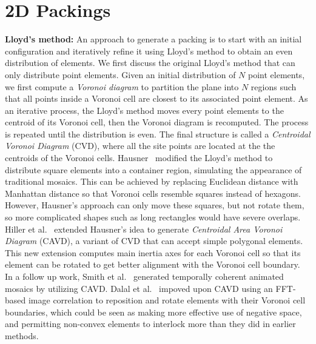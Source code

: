 \section{2D Packings}


\textbf{Lloyd's method:}
An approach to generate a packing is to start with an initial configuration and iteratively refine it using Lloyd's method
to obtain an even distribution of elements. 
We first discuss the original Lloyd's method that can only distribute point elements.
Given an initial distribution of $N$ point elements, 
we first compute a \textit{Voronoi diagram} to partition the plane into $N$ regions such that
all points inside a Voronoi cell are closest to its associated point element.
As an iterative process, 
the Lloyd's method moves every point elements to the centroid of its Voronoi cell, 
then the Voronoi diagram is recomputed.
The process is repeated until the distribution is even.
The final structure is called a \textit{Centroidal Voronoi Diagram} (CVD), 
where all the site points are located at the the centroids of the Voronoi cells. 
Hausner~\cite{Hausner2001} modified the Lloyd's method to distribute square elements into a container 
region, simulating the appearance of traditional mosaics. 
This can be achieved by replacing Euclidean distance with Manhattan distance so that Voronoi cells resemble squares instead of hexagons.
However, Hausner's approach can only move these squares, but not rotate them,
so more complicated shapes such as long rectangles would have severe overlaps.
Hiller et al.~\cite{Hiller2003} extended Hausner's idea to generate \textit{Centroidal Area Voronoi Diagram} (CAVD),
a variant of CVD that can accept simple polygonal elements.
This new extension computes main inertia axes for each Voronoi cell so that 
its element can be rotated to get better alignment
with the Voronoi cell boundary.
In a follow up work, Smith et al.~\cite{Smith2005} generated temporally coherent animated mosaics by utilizing CAVD.
Dalal et al.~\cite{Dalal2006} impoved upon CAVD using an FFT-based image correlation to reposition
and rotate elements with their Voronoi cell boundaries, which could be seen as making more effective use of negative
space, and permitting non-convex elements to interlock more than they did in
earlier methods.


